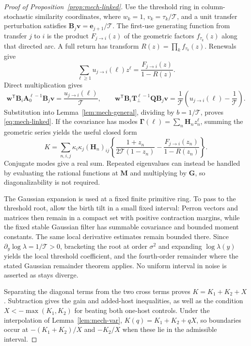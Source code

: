 \begin{proof}[Proof of Proposition~\ref{prop:mech-linked}]
Use the threshold ring in column-stochastic similarity coordinates, where \(w_k=1\), \(v_k=\tau_k/\mathcal T\), and a unit transfer perturbation satisfies \(\mathbf B_j\mathbf v=\mathbf e_{j+1}/\mathcal T\). The first-use generating function from transfer \(j\) to \(i\) is the product \(F_{j\to i}(z)\) of the geometric factors \(f_{\tau_k}(z)\) along that directed arc. A full return has transform \(R(z)=\prod_kf_{\tau_k}(z)\). Renewals give
\begin{equation}\label{eq:mech-linked-renewal}
 \sum_{\ell\geq1}u_{j\to i}(\ell)z^\ell=\frac{F_{j\to i}(z)}{1-R(z)}.
\end{equation}
Direct multiplication gives
\[
 \mathbf w^{\mathsf T}\mathbf B_i\mathbf A_0^{\ell-1}\mathbf B_j\mathbf v
 =\frac{u_{j\to i}(\ell)}{\mathcal T},\qquad
 \mathbf w^{\mathsf T}\mathbf B_i\mathbf T_\perp^{\ell-1}\mathbf Q\mathbf B_j\mathbf v
 =\frac1{\mathcal T}\left(u_{j\to i}(\ell)-\frac1{\mathcal T}\right).
\]
Substitution into Lemma~\ref{lem:mech-general}, dividing by \(b=1/\mathcal T\), proves \eqref{eq:mech-linked}. If the covariance has modes \(\boldsymbol\Gamma(\ell)=\sum_n\mathbf H_nz_n^\ell\), summing the geometric series yields the useful closed form
\begin{equation}\label{eq:mech-linked-modes}
 K=\sum_{n,i,j}\kappa_i\kappa_j(\mathbf H_n)_{ij}
 \left\{\frac{1+z_n}{2\mathcal T(1-z_n)}
 -\frac{F_{j\to i}(z_n)}{1-R(z_n)}\right\}.
\end{equation}
Conjugate modes give a real sum. Repeated eigenvalues can instead be handled by evaluating the rational functions at \(\mathbf M\) and multiplying by \(\mathbf G\), so diagonalizability is not required.

The Gaussian expansion is used at a fixed finite primitive ring. To pass to the threshold root, allow the birth tilt in a small fixed interval: Perron vectors and matrices then remain in a compact set with positive contraction margins, while the fixed stable Gaussian filter has summable covariance and bounded moment constants. The same local derivative estimates remain bounded there. Since \(\partial_y\log\lambda=1/\mathcal T>0\), bracketing the root at order \(\sigma^2\) and expanding \(\log\lambda(y)\) yields the local threshold coefficient, and the fourth-order remainder where the stated Gaussian remainder theorem applies. No uniform interval in noise is asserted as stays diverge.

Separating the diagonal terms from the two cross terms proves \(K=K_1+K_2+X\). Subtraction gives the gain and added-host inequalities, as well as the condition \(X<-\max(K_1,K_2)\) for beating both one-host controls. Under the interpolation of Lemma~\ref{lem:mech-var}, \(K(q)=K_1+K_2+qX\), so boundaries occur at \(-(K_1+K_2)/X\) and \(-K_2/X\) when these lie in the admissible interval.


\end{proof}
